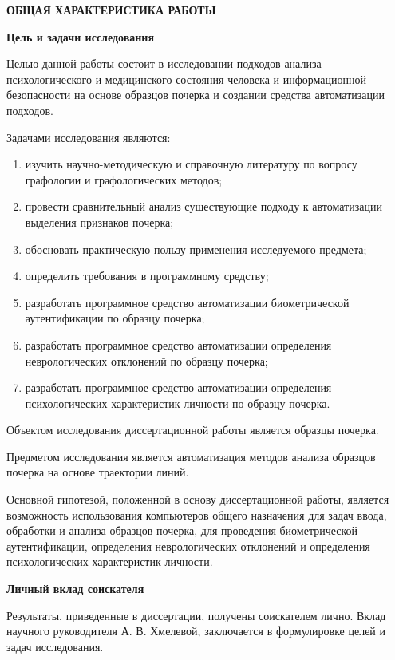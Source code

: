 \begin{center}
{\bfseries ОБЩАЯ ХАРАКТЕРИСТИКА РАБОТЫ}
\end{center}

\textbf{Цель и задачи исследования}
\bigskip

Целью данной работы состоит в исследовании подходов анализа психологического и медицинского состояния человека и информационной безопасности на основе образцов почерка и создании средства автоматизации подходов.

Задачами исследования являются:
\begin{enumerate}
  \item изучить научно-методическую и справочную литературу по вопросу графологии и графологических методов;
  \item провести сравнительный анализ существующие подходу к автоматизации выделения признаков почерка;
  \item обосновать практическую пользу применения исследуемого \mbox{предмета};
  \item определить требования в программному средству;
  \item разработать программное средство автоматизации биометрической аутентификации по образцу почерка;
  \item разработать программное средство автоматизации определения неврологических отклонений по образцу почерка;
  \item разработать программное средство автоматизации определения психологических характеристик личности по образцу почерка.
\end{enumerate}

Объектом исследования диссертационной работы является образцы \mbox{почерка.}

Предметом исследования является автоматизация методов анализа образцов почерка на основе траектории линий.

Основной гипотезой, положенной в основу диссертационной работы, является возможность использования компьютеров общего назначения для задач ввода, обработки и анализа образцов почерка, для проведения биометрической аутентификации, определения неврологических отклонений и определения психологических характеристик личности. 

\bigskip
\textbf{Личный вклад соискателя}
\bigskip

Результаты, приведенные в диссертации, получены  соискателем лично. Вклад научного руководителя А. В. Хмелевой, заключается в формулировке целей и задач исследования.

